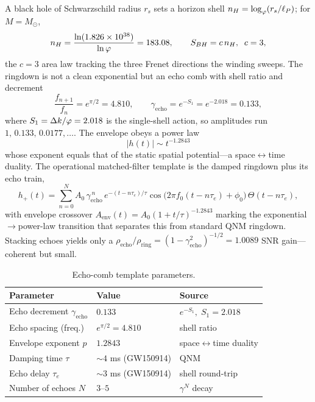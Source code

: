 A black hole of Schwarzschild radius $r_s$ sets a horizon shell $n_H=\log_{\varphi}(r_s/\ell_{P})$; for $M=M_\odot$,
\begin{equation}
n_H=\frac{\ln(1.826\times10^{38})}{\ln\varphi}=183.08 ,\qquad S_{BH}=c\,n_H,\;\; c=3 ,
\label{eq:cosmo:horizonshell}
\end{equation}
the $c=3$ area law tracking the three Frenet directions the winding sweeps. The ringdown is not a clean exponential but an echo comb with shell ratio and decrement
\begin{equation}
\frac{f_{n+1}}{f_n}=e^{\pi/2}=4.810 ,\qquad
\gamma_{\mathrm{echo}}=e^{-S_1}=e^{-2.018}=0.133 ,
\label{eq:cosmo:comb}
\end{equation}
where $S_1=\Delta k/\varphi=2.018$ is the single-shell action, so amplitudes run $1,\,0.133,\,0.0177,\dots$. The envelope obeys a power law
\begin{equation}
\boxed{\;|h(t)|\sim t^{-1.2843}\;}
\label{eq:cosmo:envelope}
\end{equation}
whose exponent equals that of the static spatial potential---a space$\leftrightarrow$time duality. The operational matched-filter template is the damped ringdown plus its echo train,
\begin{equation}
h_+(t)=\sum_{n=0}^{N}A_0\,\gamma_{\mathrm{echo}}^{\,n}\,
e^{-(t-n\tau_e)/\tau}\cos\!\big(2\pi f_0(t-n\tau_e)+\phi_0\big)\,\Theta(t-n\tau_e),
\label{eq:cosmo:template}
\end{equation}
with envelope crossover $A_{\mathrm{env}}(t)=A_0(1+t/\tau)^{-1.2843}$ marking the exponential$\to$power-law transition that separates this from standard QNM ringdown. Stacking echoes yields only a $\rho_{\mathrm{echo}}/\rho_{\mathrm{ring}}=(1-\gamma_{\mathrm{echo}}^2)^{-1/2}=1.0089$ SNR gain---coherent but small.

\begin{table}[t]
\centering
\begin{tabular}{lll}
\toprule
Parameter & Value & Source \\
\midrule
Echo decrement $\gamma_{\mathrm{echo}}$ & $0.133$ & $e^{-S_1},\;S_1=2.018$ \\
Echo spacing (freq.) & $e^{\pi/2}=4.810$ & shell ratio \\
Envelope exponent $p$ & $1.2843$ & space$\leftrightarrow$time duality \\
Damping time $\tau$ & $\sim4$ ms (GW150914) & QNM \\
Echo delay $\tau_e$ & $\sim3$ ms (GW150914) & shell round-trip \\
Number of echoes $N$ & $3$--$5$ & $\gamma^{N}$ decay \\
\bottomrule
\end{tabular}
\caption{Echo-comb template parameters.}
\label{tab:cosmo:template}
\end{table}

